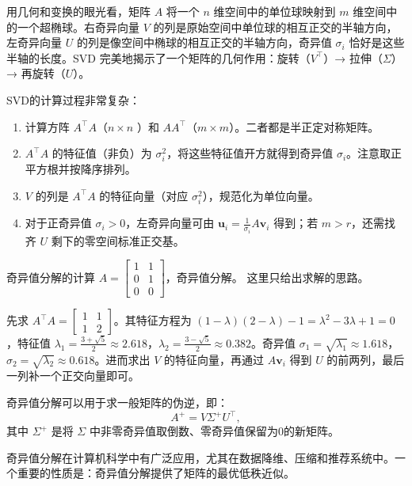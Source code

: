 用几何和变换的眼光看，矩阵 \(A\) 将一个 \(n\) 维空间中的单位球映射到 \(m\) 维空间中的一个超椭球。右奇异向量 \(V\) 的列是原始空间中单位球的相互正交的半轴方向，左奇异向量 \(U\) 的列是像空间中椭球的相互正交的半轴方向，奇异值 \(\sigma_i\) 恰好是这些半轴的长度。SVD 完美地揭示了一个矩阵的几何作用：旋转（\(V^\top\)）→ 拉伸（\(\Sigma\)）→ 再旋转（\(U\)）。

SVD的计算过程非常复杂：
\begin{enumerate}
    \item 计算方阵 \(A^\top A\)（\(n\times n\) ）和 \(A A^\top\)（\(m\times m\)）。二者都是半正定对称矩阵。
    \item \(A^\top A\) 的特征值（非负）为 \(\sigma_i^2\)，将这些特征值开方就得到奇异值 \(\sigma_i\)。注意取正平方根并按降序排列。
    \item \(V\) 的列是 \(A^\top A\) 的特征向量（对应 \(\sigma_i^2\)），规范化为单位向量。
    \item 对于正奇异值 \(\sigma_i > 0\)，左奇异向量可由 \(\mathbf{u}_i = \frac{1}{\sigma_i} A \mathbf{v}_i\) 得到；若 \(m > r\)，还需找齐 \(U\) 剩下的零空间标准正交基。
\end{enumerate}

\begin{example}{奇异值分解的计算}{}
    \(A =
        \begin{bmatrix} 1 & 1 \\ 0 & 1 \\ 0 & 0
    \end{bmatrix}\)，奇异值分解。
    \tcblower
    这里只给出求解的思路。

    先求 \(A^\top A =
        \begin{bmatrix} 1 & 1 \\ 1 & 2
    \end{bmatrix}\)。其特征方程为 \((1-\lambda)(2-\lambda)-1 = \lambda^2 - 3\lambda + 1 = 0\)，特征值 \(\lambda_1 = \frac{3+\sqrt{5}}{2} \approx 2.618\)，\(\lambda_2 = \frac{3-\sqrt{5}}{2} \approx 0.382\)。奇异值 \(\sigma_1 = \sqrt{\lambda_1} \approx 1.618\)，\(\sigma_2 = \sqrt{\lambda_2} \approx 0.618\)。进而求出 \(V\) 的特征向量，再通过 \(A\mathbf{v}_i\) 得到 \(U\) 的前两列，最后一列补一个正交向量即可。
\end{example}

奇异值分解可以用于求一般矩阵的伪逆，即：
\[
    A^+ = V \Sigma^+ U^\top,
\]
其中 \(\Sigma^+\) 是将 \(\Sigma\) 中非零奇异值取倒数、零奇异值保留为0的新矩阵。

奇异值分解在计算机科学中有广泛应用，尤其在数据降维、压缩和推荐系统中。一个重要的性质是：奇异值分解提供了矩阵的最优低秩近似。

